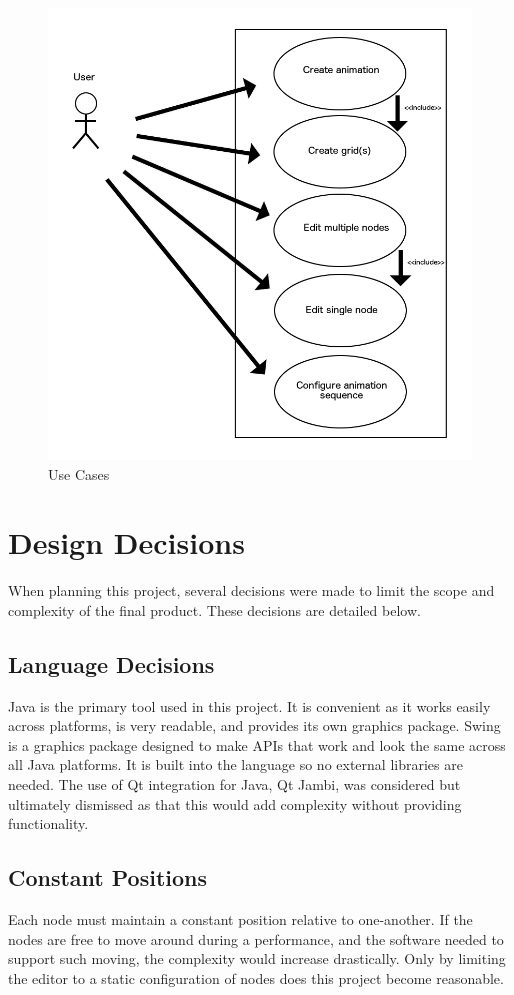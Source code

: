 \documentclass[12pt]{article}
\begin{document}
  	\begin{figure}[ht!]
  		\centering
  		\includegraphics[width=0.9\linewidth]{Relationship_Use.png}
  		\caption{Use Cases}
  	\end{figure}
	\clearpage	
\newpage

	\section{Design Decisions}
    When planning this project, several decisions were made to limit the scope and complexity of the final product. These decisions are detailed below. 
    
  	\subsection{Language Decisions}
    	Java is the primary tool used in this project. It is convenient as it works easily across platforms, is very readable, and provides its own graphics package. Swing is a graphics package designed to make APIs that work and look the same across all Java platforms. It is built into the language so no external libraries are needed. The use of Qt integration for Java, Qt Jambi, was considered but ultimately dismissed as that this would add complexity without providing functionality. 
      
  	\subsection{Constant Positions}
    	Each node must maintain a constant position relative to one-another. If the nodes are free to move around during a performance, and the software needed to support such moving, the complexity would increase drastically. Only by limiting the editor to a static configuration of nodes does this project become reasonable. 
      
\end{document}
